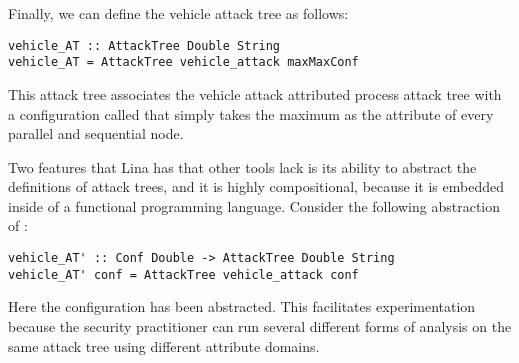 Finally, we can define the vehicle attack tree as follows:
\begin{verbatim}
vehicle_AT :: AttackTree Double String
vehicle_AT = AttackTree vehicle_attack maxMaxConf
\end{verbatim}
This attack tree associates the vehicle attack attributed process
attack tree with a configuration called  that simply
takes the maximum as the attribute of every parallel and sequential node.

Two features that Lina has that other tools lack is its ability to
abstract the definitions of attack trees, and it is highly
compositional, because it is embedded inside of a functional
programming language.  Consider the following abstraction of
:
\begin{verbatim}
vehicle_AT' :: Conf Double -> AttackTree Double String
vehicle_AT' conf = AttackTree vehicle_attack conf
\end{verbatim}
Here the configuration has been abstracted.  This facilitates
experimentation because the security practitioner can run several
different forms of analysis on the same attack tree using different
attribute domains.


